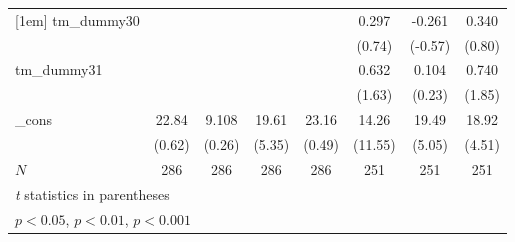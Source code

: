 {\begin{tabular}{l*{7}{c}}
[1em]
tm\_dummy30  &                     &                     &                     &                     &       0.297         &      -0.261         &       0.340         \\
            &                     &                     &                     &                     &      (0.74)         &     (-0.57)         &      (0.80)         \\
[1em]
tm\_dummy31  &                     &                     &                     &                     &       0.632         &       0.104         &       0.740         \\
            &                     &                     &                     &                     &      (1.63)         &      (0.23)         &      (1.85)         \\
[1em]
\_cons      &       22.84         &       9.108         &       19.61\sym{***}&       23.16         &       14.26\sym{***}&       19.49\sym{***}&       18.92\sym{***}\\
            &      (0.62)         &      (0.26)         &      (5.35)         &      (0.49)         &     (11.55)         &      (5.05)         &      (4.51)         \\
\hline
\(N\)       &         286         &         286         &         286         &         286         &         251         &         251         &         251         \\
\hline\hline
\multicolumn{8}{l}{\footnotesize \textit{t} statistics in parentheses}\\
\multicolumn{8}{l}{\footnotesize \sym{*} \(p<0.05\), \sym{**} \(p<0.01\), \sym{***} \(p<0.001\)}\\
\end{tabular}
}
